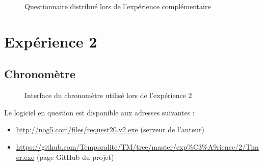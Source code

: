 \documentclass[12pt,fleqn,oneside,french,openany]{book} %
\begin{document}
\clearpage
\begin{figure}[htp] 
	\caption{Questionnaire distribué lors de l'expérience complémentaire}
\end{figure}

\clearpage
\section*{Expérience 2}
\subsection*{Chronomètre} \label{sec:chrono}
\begin{figure}[htp] 
	\caption{Interface du chronomètre utilisé lors de l'expérience 2}
\end{figure}
Le logiciel en question est disponible aux adresses suivantes :
\begin{itemize}
\item \url{http://nog5.com/files/request20.v2.exe} (serveur de l'auteur)
\item \url{https://github.com/Temporalite/TM/tree/master/exp%C3%A9rience/2/Timer.exe} (page GitHub du projet)
\end{itemize}
\end{document}
